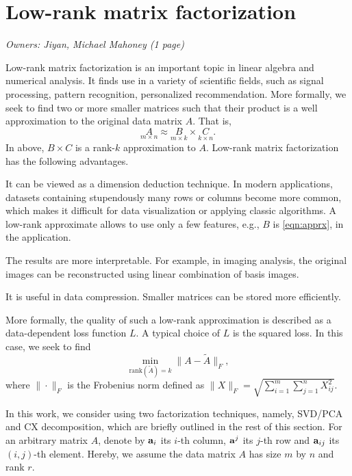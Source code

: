 \section{Low-rank matrix factorization}
\textit{Owners: Jiyan, Michael Mahoney (1 page)}

Low-rank matrix factorization is an important topic in linear algebra and numerical analysis.
It finds use in a variety of scientific fields, such as signal processing, pattern recognition, personalized recommendation.
More formally, we seek to find two or more smaller matrices such that their product is a well approximation to the original data matrix $A$.
That is,
\begin{equation}
 \label{eqn:apprx}
    \underset{m\times n}{A} \approx \underset{m\times k}{B} \times \underset{k\times n}{C}.
\end{equation}
In above, $B \times C$ is a rank-$k$ approximation to $A$.
Low-rank matrix factorization has the following advantages.
\begin{compactitem}
\item
It can be viewed as a dimension deduction technique.
In modern applications, datasets containing stupendously many rows or columns become more common, which makes it difficult for data visualization or applying classic algorithms. A low-rank approximate allows to use only a few features, e.g., $B$ is \eqref{eqn:apprx}, in the application.
\item
The results are more interpretable.
For example, in imaging analysis, the original images can be reconstructed using linear combination of basis images.
\item
It is useful in data compression.
Smaller matrices can be stored more efficiently.
\end{compactitem}

More formally, the quality of such a low-rank approximation is described as a data-dependent loss function $L$. A typical choice of $L$ is the squared loss. In this case, we seek to find
\begin{equation}
 \label{eqn:obj}
  \min_{\text{rank}(\tilde A) = k} \| A - \tilde A \|_F,
\end{equation}
where $\| \cdot \|_F$ is the Frobenius norm defined as $\|X\|_F = \sqrt{ \sum_{i=1}^m \sum_{j=1}^n X_{ij}^2 }$.

In this work, we consider using two factorization techniques, namely, SVD/PCA and CX decomposition, which are briefly outlined in the rest of this section. For an arbitrary matrix $A$, denote by $\mathbf{a}_i$ its $i$-th column, $\mathbf{a}^j$ its $j$-th row and $\mathbf{a}_{ij}$ its $(i,j)$-th element. Hereby, we assume the data matrix $A$ has size $m$ by $n$ and rank $r$.

